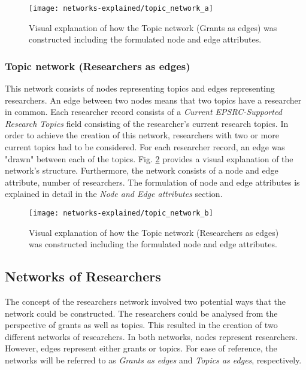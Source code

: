 \begin{figure}[!htbp]
    \centering
    \texttt{[image: networks-explained/topic\_network\_a]}
    \caption{Visual explanation of how the Topic network (Grants as edges) was constructed including the formulated node and edge attributes.}
    \label{fig:topic_a_structure}
\end{figure}

\subsubsection{Topic network (Researchers as edges)}

This network consists of nodes representing topics and edges representing researchers. An edge between two nodes means that two topics have a researcher in common. Each researcher record consists of a \textit{Current EPSRC-Supported Research Topics} field consisting of the researcher's current research topics. In order to achieve the creation of this network, researchers with two or more current topics had to be considered. For each researcher record, an edge was "drawn" between each of the topics. Fig. \ref{fig:topic_b_structure} provides a visual explanation of the network's structure. Furthermore, the network consists of a node and edge attribute, number of researchers. The formulation of node and edge attributes is explained in detail in the \textit{Node and Edge attributes} section.

\begin{figure}[!htbp]
    \centering
    \texttt{[image: networks-explained/topic\_network\_b]}
    \caption{Visual explanation of how the Topic network (Researchers as edges) was constructed including the formulated node and edge attributes.}
    \label{fig:topic_b_structure}
\end{figure}

\subsection{Networks of Researchers}

The concept of the researchers network involved two potential ways that the network could be constructed. The researchers could be analysed from the perspective of grants as well as topics. This resulted in the creation of two different networks of researchers. In both networks, nodes represent researchers. However, edges represent either grants or topics.  For ease of reference, the networks will be referred to as \textit{Grants as edges} and \textit{Topics as edges}, respectively.

